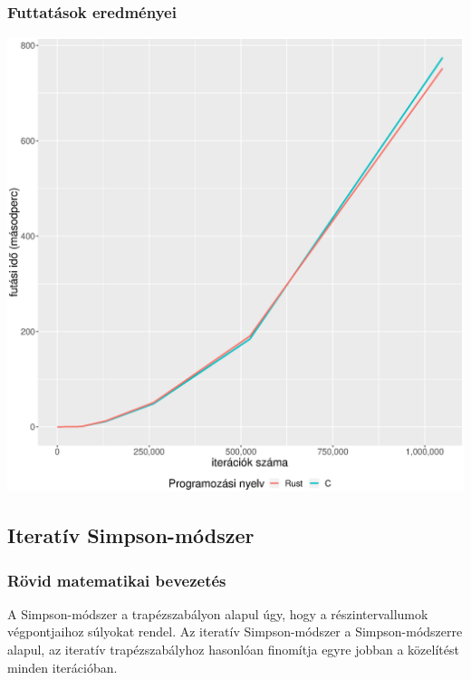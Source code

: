 \subsubsection{Futtatások eredményei}

\includegraphics[width=15.5cm]{kepek/trapedozial_rule_run.eps}

\subsection{Iteratív Simpson-módszer}

\subsubsection{Rövid matematikai bevezetés}

A Simpson-módszer a trapézszabályon alapul úgy, hogy a részintervallumok végpontjaihoz súlyokat rendel. Az iteratív Simpson-módszer a Simpson-módszerre alapul, az iteratív trapézszabályhoz hasonlóan finomítja egyre jobban a közelítést minden iterációban.

